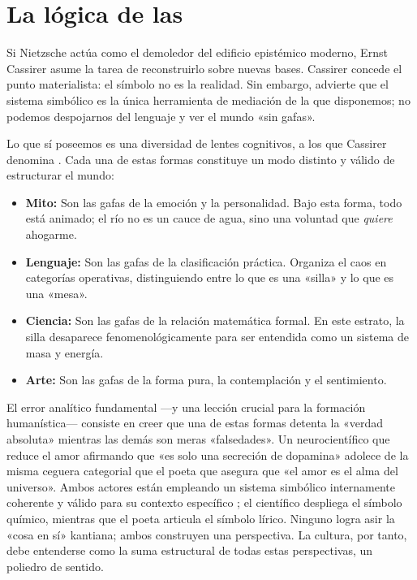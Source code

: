 \section{La lógica de las \FormasSimbolicas{}}

Si Nietzsche actúa como el demoledor del edificio epistémico moderno, Ernst Cassirer asume la tarea de reconstruirlo sobre nuevas bases. Cassirer concede el punto materialista: el símbolo no es la realidad. Sin embargo, advierte que el sistema simbólico es la única herramienta de mediación de la que disponemos; no podemos despojarnos del lenguaje y ver el mundo «sin gafas». 

Lo que sí poseemos es una diversidad de lentes cognitivos, a los que Cassirer denomina \textbf{\FormasSimbolicas}. Cada una de estas formas constituye un modo distinto y válido de estructurar el mundo:
\begin{itemize}
    \item \textbf{Mito:} Son las gafas de la emoción y la personalidad. Bajo esta forma, todo está animado; el río no es un cauce de agua, sino una voluntad que \textit{quiere} ahogarme.
    \item \textbf{Lenguaje:} Son las gafas de la clasificación práctica. Organiza el caos en categorías operativas, distinguiendo entre lo que es una «silla» y lo que es una «mesa».
    \item \textbf{Ciencia:} Son las gafas de la relación matemática formal. En este estrato, la silla desaparece fenomenológicamente para ser entendida como un sistema de masa y energía.
    \item \textbf{Arte:} Son las gafas de la forma pura, la contemplación y el sentimiento.
\end{itemize}

El error analítico fundamental —y una lección crucial para la formación humanística— consiste en creer que una de estas formas detenta la «verdad absoluta» mientras las demás son meras «falsedades». Un neurocientífico que reduce el amor afirmando que «es solo una secreción de dopamina» adolece de la misma ceguera categorial que el poeta que asegura que «el amor es el alma del universo». Ambos actores están empleando un sistema simbólico internamente coherente y válido para su contexto específico ; el científico despliega el símbolo químico, mientras que el poeta articula el símbolo lírico. Ninguno logra asir la «cosa en sí» kantiana; ambos construyen una perspectiva. La cultura, por tanto, debe entenderse como la suma estructural de todas estas perspectivas, un poliedro de sentido.

